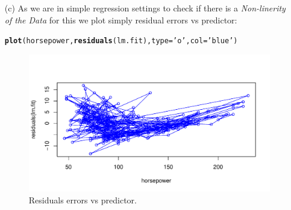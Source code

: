 \documentclass[a4paper, 10pt]{scrartcl}\usepackage[]{graphicx}\usepackage[]{color}
\makeatletter
\def\maxwidth{ %
  \ifdim\Gin@nat@width>\linewidth
    \linewidth
  \else
    \Gin@nat@width
  \fi
}
\newcommand{\hlstr}[1]{\textcolor[rgb]{0.192,0.494,0.8}{#1}}%
\newcommand{\hlstd}[1]{\textcolor[rgb]{0.345,0.345,0.345}{#1}}%
\newcommand{\hlkwc}[1]{\textcolor[rgb]{0.333,0.667,0.333}{#1}}%
\newcommand{\hlkwd}[1]{\textcolor[rgb]{0.737,0.353,0.396}{\textbf{#1}}}%
\newenvironment{kframe}{%
 \def\at@end@of@kframe{}%
 \ifinner\ifhmode%
  \def\at@end@of@kframe{\end{minipage}}%
  \begin{minipage}{\columnwidth}%
 \fi\fi%
 \def\FrameCommand##1{\hskip\@totalleftmargin \hskip-\fboxsep
 \colorbox{shadecolor}{##1}\hskip-\fboxsep
     \hskip-\linewidth \hskip-\@totalleftmargin \hskip\columnwidth}%
 \MakeFramed {\advance\hsize-\width
   \@totalleftmargin\z@ \linewidth\hsize
   \@setminipage}}%
 {\par\unskip\endMakeFramed%
 \at@end@of@kframe}
\newenvironment{knitrout}{}{} %
\makeatother
\begin{document}
\begin{itemize}
\begin{knitrout}
\end{knitrout}
	\item[(c)] As we are in simple regression settings to check
		if there is a \emph{Non-linerity of the Data} for this
		we plot simply residual errors vs predictor:
\begin{knitrout}
\color{fgcolor}\begin{kframe}
\begin{alltt}
\hlkwd{plot}\hlstd{(horsepower,} \hlkwd{residuals}\hlstd{(lm.fit),} \hlkwc{type}\hlstd{=}\hlstr{'o'}\hlstd{,} \hlkwc{col}\hlstd{=}\hlstr{'blue'}\hlstd{)}
\end{alltt}
\end{kframe}\begin{figure}[H]
\includegraphics[width=\maxwidth]{figure/p2b-1} \caption[Residuals errors vs predictor]{Residuals errors vs predictor.}\label{fig:p2b}
\end{figure}



\end{knitrout}
\end{itemize}
\end{document}
